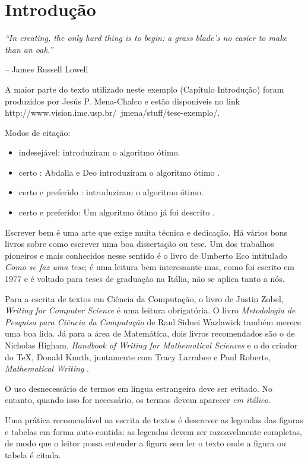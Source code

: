 \chapter{Introdução}
\label{chp:introducao}

\epigraph{\it ``In creating, the only hard thing is to begin: a grass blade's no easier to make than an oak.''}{-- James Russell Lowell}

A maior parte do texto utilizado neste exemplo (Capítulo Introdução) foram produzidos por Jesús P. Mena-Chalco e estão disponíveis no link http://www.vision.ime.usp.br/~jmena/stuff/tese-exemplo/.

Modos de citação:
\begin{itemize}
  \item indesejável: \citep{Abdalla2002} introduziram o algoritmo ótimo.
  \item certo : Abdalla e Deo introduziram o algoritmo ótimo \citep{Abdalla2002}.
  \item certo e preferido : \citet{Knuth1996} introduziram o algoritmo ótimo.
  \item certo e preferido: Um algoritmo ótimo já foi descrito \citep{Knuth1996}.
\end{itemize}

Escrever bem é uma arte que exige muita técnica e dedicação. Há vários bons livros
sobre como escrever uma boa dissertação ou tese. Um dos trabalhos pioneiros e mais
conhecidos nesse sentido é o livro de Umberto Eco \citep{Eco2009} intitulado 
\emph{Como se faz uma tese}; é uma leitura bem interessante mas, como foi escrito 
em 1977 e é voltado para teses de graduação na Itália, não se aplica tanto a nós.

Para a escrita de textos em Ciência da Computação, o livro de Justin Zobel, 
\emph{Writing for Computer Science} \citep{Zobel2004} é uma leitura obrigatória. 
O livro \emph{Metodologia de Pesquisa para Ciência da Computação} de 
Raul Sidnei Wazlawick \citep{Waz2009} também merece uma boa lida.
Já para a área de Matemática, dois livros recomendados são o de Nicholas Higham,
\emph{Handbook of Writing for Mathematical Sciences} \citep{Higham1998} e o do criador
do \TeX, Donald Knuth, juntamente com Tracy Larrabee e Paul Roberts, 
\emph{Mathematical Writing} \citep{Knuth1996}.

O uso desnecessário de termos em língua estrangeira deve ser evitado. No entanto,
quando isso for necessário, os termos devem aparecer \emph{em itálico}.

Uma prática recomendável na escrita de textos é descrever as legendas das
figuras e tabelas em forma auto-contida: as legendas devem ser razoavelmente
completas, de modo que o leitor possa entender a figura sem ler o texto onde a
figura ou tabela é citada.  

